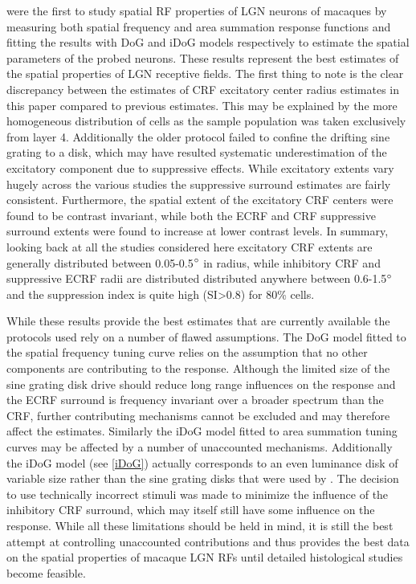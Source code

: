 \cite{Sceniak2006} were the first to study spatial RF properties of
LGN neurons of macaques by measuring both spatial frequency and area
summation response functions and fitting the results with DoG and iDoG
models respectively to estimate the spatial parameters of the probed
neurons. These results represent the best estimates of the spatial
properties of LGN receptive fields. The first thing to note is the
clear discrepancy between the estimates of CRF excitatory center
radius estimates in this paper compared to previous estimates. This
may be explained by the more homogeneous distribution of cells as the
sample population was taken exclusively from layer 4. Additionally the
older protocol failed to confine the drifting sine grating to a disk,
which may have resulted systematic underestimation of the excitatory
component due to suppressive effects. While excitatory extents vary
hugely across the various studies the suppressive surround estimates
are fairly consistent. Furthermore, the spatial extent of the
excitatory CRF centers were found to be contrast invariant, while both
the ECRF and CRF suppressive surround extents were found to increase
at lower contrast levels. In summary, looking back at all the studies
considered here excitatory CRF extents are generally distributed
between 0.05-0.5$\degree$ in radius, while inhibitory CRF and
suppressive ECRF radii are distributed distributed anywhere between
0.6-1.5$\degree$ and the suppression index is quite high
(SI\textgreater0.8) for 80\% cells.

While these results provide the best estimates that are currently
available the protocols used rely on a number of flawed
assumptions. The DoG model fitted to the spatial frequency tuning
curve relies on the assumption that no other components are
contributing to the response. Although the limited size of the sine
grating disk drive should reduce long range influences on the response
and the ECRF surround is frequency invariant over a broader spectrum
than the CRF, further contributing mechanisms cannot be excluded and
may therefore affect the estimates. Similarly the iDoG model fitted to
area summation tuning curves may be affected by a number of
unaccounted mechanisms. Additionally the iDoG model (see \ref{iDoG})
actually corresponds to an even luminance disk of variable size rather
than the sine grating disks that were used by \cite{Sceniak2006}. The
decision to use technically incorrect stimuli was made to minimize the
influence of the inhibitory CRF surround, which may itself still have
some influence on the response. While all these limitations should be
held in mind, it is still the best attempt at controlling unaccounted
contributions and thus provides the best data on the spatial
properties of macaque LGN RFs until detailed histological studies
become feasible.

